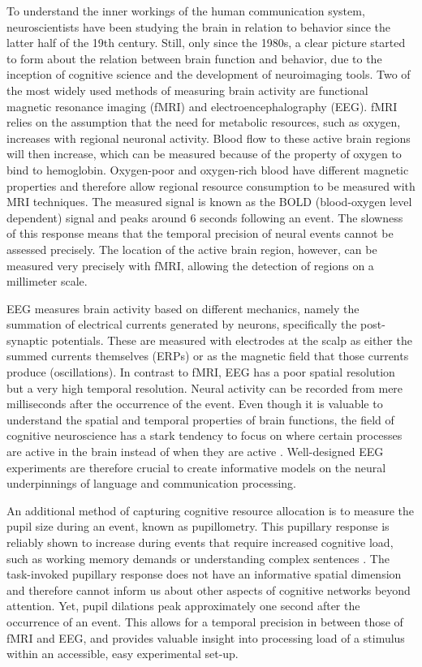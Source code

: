 To understand the inner workings of the human communication system, neuroscientists have been studying the brain in relation to behavior since the latter half of the 19th century. Still, only since the 1980s, a clear picture started to form about the relation between brain function and behavior, due to the inception of cognitive science and the development of neuroimaging tools. Two of the most widely used methods of measuring brain activity are functional magnetic resonance imaging (fMRI) and electroencephalography (EEG). fMRI relies on the assumption that the need for metabolic resources, such as oxygen, increases with regional neuronal activity. Blood flow to these active brain regions will then increase, which can be measured because of the property of oxygen to bind to hemoglobin. Oxygen-poor and oxygen-rich blood have different magnetic properties and therefore allow regional resource consumption to be measured with MRI techniques. The measured signal is known as the BOLD (blood-oxygen level dependent) signal and peaks around 6 seconds following an event. The slowness of this response means that the temporal precision of neural events cannot be assessed precisely. The location of the active brain region, however, can be measured very precisely with fMRI, allowing the detection of regions on a millimeter scale. 

EEG measures brain activity based on different mechanics, namely the summation of electrical currents generated by neurons, specifically the post-synaptic potentials. These are measured with electrodes at the scalp as either the summed currents themselves (ERPs) or as the magnetic field that those currents produce (oscillations). In contrast to fMRI, EEG has a poor spatial resolution but a very high temporal resolution. Neural activity can be recorded from mere milliseconds after the occurrence of the event. Even though it is valuable to understand the spatial and temporal properties of brain functions, the field of cognitive neuroscience has a stark tendency to focus on where certain processes are active in the brain instead of when they are active \citep{poeppel2012}. Well-designed EEG experiments are therefore crucial to create informative models on the neural underpinnings of language and communication processing.  


An additional method of capturing cognitive resource allocation is to measure the pupil size during an event, known as pupillometry. This pupillary response is reliably shown to increase during events that require increased cognitive load, such as working memory demands or understanding complex sentences \citep{beatty1982}. The task-invoked pupillary response does not have an informative spatial dimension and therefore cannot inform us about other aspects of cognitive networks beyond attention. Yet, pupil dilations peak approximately one second after the occurrence of an event. This allows for a temporal precision in between those of fMRI and EEG, and provides valuable insight into processing load of a stimulus within an accessible, easy experimental set-up. 

